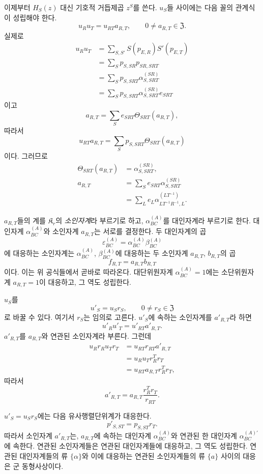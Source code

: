 이제부터 \(H_S(z)\) 대신 기호적 거듭제곱 \(z^S\)를 쓴다. \(u_S\)들 사이에는 다음 꼴의 관계식이 성립해야 한다.
\[
        u_Ru_T=u_{RT}a_{R,T},
        \qquad
        0\ne a_{R,T}\in\mathfrak Z.
\]
실제로
\[
\begin{aligned}
u_Ru_T
 &=\sum_{S,S'}S(p_{E,R})S'(p_{E,T})\\
 &=\sum_Sp_{S,SR}p_{SR,SRT}\\
 &=\sum_Sp_{S,SRT}\alpha_{S,SRT}^{(SR)}\\
 &=\sum_Sp_{S,SRT}\alpha_{S,SRT}^{(SR)}e_{SRT}
\end{aligned}
\]
이고
\[
        a_{R,T}
        =\sum_Se_{SRT}\Theta_{SRT}(a_{R,T}),
\]
따라서
\[
        u_{RT}a_{R,T}
        =\sum_Sp_{S,SRT}\Theta_{SRT}(a_{R,T})
\]
이다. 그러므로
\[
\begin{aligned}
\Theta_{SRT}(a_{R,T})
 &=\alpha_{S,SRT}^{(SR)},\\
a_{R,T}
 &=\sum_Se_{SRT}\alpha_{S,SRT}^{(SR)}\\
 &=\sum_Le_L
   \alpha_{LT^{-1}R^{-1},L}^{(LT^{-1})}.
\end{aligned}
\]

\(a_{R,T}\)들의 계를 \(\mathfrak K_r\)의 \emph{소인자계}라 부르기로 하고, \(\alpha_{BC}^{(A)}\)를 대인자계라 부르기로 한다. 대인자계 \(\alpha_{BC}^{(A)}\)와 소인자계 \(a_{R,T}\)는 서로를 결정한다. 두 대인자계의 곱
\[
        \varepsilon_{BC}^{(A)}
        =\alpha_{BC}^{(A)}\beta_{BC}^{(A)}
\]
에 대응하는 소인자계는 \(\alpha_{BC}^{(A)}\), \(\beta_{BC}^{(A)}\)에 대응하는 두 소인자계 \(a_{R,T}\), \(b_{R,T}\)의 곱
\[
        f_{R,T}=a_{R,T}b_{R,T}
\]
이다. 이는 위 공식들에서 곧바로 따라온다. 대단위원자계 \(\alpha_{BC}^{(A)}=1\)에는 소단위원자계 \(a_{R,T}=1\)이 대응하고, 그 역도 성립한다.

\(u_S\)를
\[
        u'_S=u_Sr_S,
        \qquad
        0\ne r_S\in\mathfrak Z
\]
로 바꿀 수 있다. 여기서 \(r_S\)는 임의로 고른다. \(u'_S\)에 속하는 소인자계를 \(a'_{R,T}\)라 하면
\[
\tag{1}
        u'_Ru'_T=u'_{RT}a'_{R,T}.
\]
\(a'_{R,T}\)를 \(a_{R,T}\)와 연관된 소인자계라 부른다. 그런데
\[
\begin{aligned}
u_Rr_Ru_Tr_T
 &=u_{RT}r_{RT}a'_{R,T}\\
 &=u_Ru_Tr_R^Tr_T\\
 &=u_{RT}a_{R,T}r_R^Tr_T,
\end{aligned}
\]
따라서
\[
\tag{2}
        a'_{R,T}
        =a_{R,T}\frac{r_R^Tr_T}{r_{RT}}.
\]

\(u'_S=u_Sr_S\)에는 다음 유사행렬단위계가 대응한다.
\[
        p'_{S,ST}=p_{S,ST}r_T.
\]
따라서 소인자계 \(a'_{R,T}\)는, \(a_{R,T}\)에 속하는 대인자계 \(\alpha_{BC}^{(A)}\)와 연관된 한 대인자계 \(\alpha_{BC}^{(A)\prime}\)에 속한다. 연관된 소인자계들은 연관된 대인자계들에 대응하고, 그 역도 성립한다. 연관된 대인자계들의 류 \(\{\alpha\}\)와 이에 대응하는 연관된 소인자계들의 류 \(\{a\}\) 사이의 대응은 군 동형사상이다.

